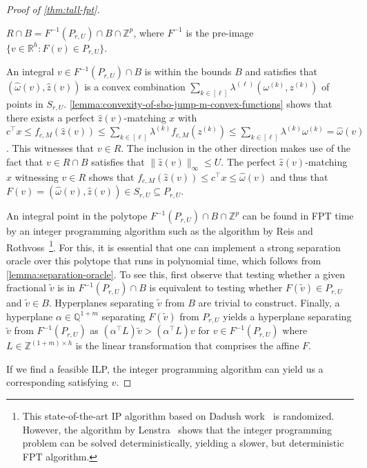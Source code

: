 \documentclass[a4paper,UKenglish,cleveref,thm-restate]{lipics-v2021}
\newcommand{\Q}{\mathbb Q}
\newcommand{\R}{\mathbb R}
\newcommand{\Z}{\mathbb Z}
\begin{document}
\begin{proof}[Proof of \cref{thm:tall-fpt}]
    \begin{claim*}
        $R\cap B=F^{-1}(P_{r,U})\cap B\cap\Z^p$, where $F^{-1}$ is the pre-image $\{v\in\R^h\colon F(v)\in P_{r,U}\}$.
    \end{claim*}
    \begin{claimproof}
        An integral $v\in F^{-1}(P_{r,U})\cap B$ is within the bounds $B$ and satisfies that $(\hat\omega(v),\hat z(v))$ is a convex combination $\sum_{k\in[\ell]}\lambda^{(\ell)}(\omega^{(k)},z^{(k)})$ of points in $S_{r,U}$. \cref{lemma:convexity-of-sbo-jump-m-convex-functions} shows that there exists a perfect $\hat z(v)$-matching $x$ with $c^\top x\le f_{c,M}(\hat z(v))\le\sum_{k\in[\ell]}\lambda^{(k)}f_{c,M}(z^{(k)})\le\sum_{k\in[\ell]}\lambda^{(k)}\omega^{(k)}=\hat\omega(v)$. This witnesses that $v\in R$. The inclusion in the other direction makes use of the fact that $v\in R\cap B$ satisfies that $\|\hat z(v)\|_\infty\le U$. The perfect $\hat z(v)$-matching $x$ witnessing $v\in R$ shows that $f_{c,M}(\hat z(v))\le c^\top x\le\hat\omega(v)$ and thus that $F(v)=(\hat\omega(v),\hat z(v))\in S_{r,U}\subseteq P_{r,U}$.
    \end{claimproof}

    An integral point in the polytope $F^{-1}(P_{r,U})\cap B\cap\Z^p$ can be found in FPT time by an integer programming algorithm such as the algorithm by Reis and Rothvoss~\cite{DBLP:conf/focs/ReisR23}\footnote{This state-of-the-art IP algorithm based on Dadush work~\cite{dadush2012integer} is randomized. However, the algorithm by Lenstra~\cite{DBLP:journals/mor/Lenstra83} shows that the integer programming problem can be solved deterministically, yielding a slower, but deterministic FPT algorithm.}. For this, it is essential that one can implement a strong separation oracle over this polytope that runs in polynomial time, which follows from \cref{lemma:separation-oracle}. To see this, first observe that testing whether a given fractional $\tilde v$ is in $F^{-1}(P_{r,U})\cap B$ is equivalent to testing whether $F(\tilde v)\in P_{r,U}$ and $\tilde v\in B$. Hyperplanes separating $\tilde v$ from $B$ are trivial to construct. Finally, a hyperplane $\alpha\in\Q^{1+m}$ separating $F(\tilde v)$ from $P_{r,U}$ yields a hyperplane separating $\tilde v$ from $F^{-1}(P_{r,U})$ as $(\alpha^\top L)\tilde v>(\alpha^\top L)v$ for $v\in F^{-1}(P_{r,U})$ where $L\in\Z^{(1+m)\times h}$ is the linear transformation that comprises the affine $F$.

    If we find a feasible ILP, the integer programming algorithm can yield us a corresponding satisfying $v$.
\end{proof}
\end{document}
